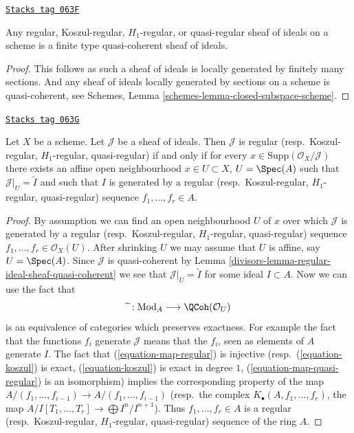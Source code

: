 \begin{lemma}
\label{divisors-lemma-regular-ideal-sheaf-quasi-coherent}
\href{https://stacks.math.columbia.edu/tag/063F}{\texttt{Stacks tag 063F}}

Any regular, Koszul-regular, $H_1$-regular, or quasi-regular sheaf
of ideals on a scheme is a finite type quasi-coherent sheaf of ideals.
\end{lemma}

\begin{proof}
This follows as such a sheaf of ideals is locally generated by
finitely many sections. And any sheaf of ideals locally generated
by sections on a scheme is quasi-coherent, see
Schemes, Lemma \ref{schemes-lemma-closed-subspace-scheme}.
\end{proof}

\begin{lemma}
\label{divisors-lemma-regular-ideal-sheaf-scheme}
\href{https://stacks.math.columbia.edu/tag/063G}{\texttt{Stacks tag 063G}}

Let $X$ be a scheme. Let $\mathcal{J}$ be a sheaf of ideals.
Then $\mathcal{J}$ is regular
(resp.\ Koszul-regular, $H_1$-regular, quasi-regular) if and only if
for every $x \in \text{Supp}(\mathcal{O}_X/\mathcal{J})$ there exists
an affine open neighbourhood $x \in U \subset X$, $U = \Spec(A)$
such that $\mathcal{J}|_U = \widetilde{I}$ and such that $I$
is generated by a regular (resp.\ Koszul-regular, $H_1$-regular,
quasi-regular) sequence $f_1, \ldots, f_r \in A$.
\end{lemma}

\begin{proof}

By assumption we can find an open neighbourhood $U$ of $x$ over which
$\mathcal{J}$ is generated by a
regular (resp.\ Koszul-regular, $H_1$-regular, quasi-regular)
sequence $f_1, \ldots, f_r \in \mathcal{O}_X(U)$. After shrinking
$U$ we may assume that $U$ is affine, say $U = \Spec(A)$.
Since $\mathcal{J}$ is quasi-coherent by
Lemma \ref{divisors-lemma-regular-ideal-sheaf-quasi-coherent}
we see that $\mathcal{J}|_U = \widetilde{I}$ for some ideal $I \subset A$.
Now we can use the fact that
$$
\widetilde{\ } : \text{Mod}_A \longrightarrow \QCoh(\mathcal{O}_U)
$$
is an equivalence of categories which preserves exactness. For example
the fact that the functions $f_i$ generate $\mathcal{J}$ means that
the $f_i$, seen as elements of $A$ generate $I$. The fact that
(\ref{equation-map-regular}) is injective
(resp.\ (\ref{equation-koszul}) is exact, (\ref{equation-koszul}) is exact
in degree $1$, (\ref{equation-map-quasi-regular}) is an isomorphism)
implies the corresponding property of the map
$A/(f_1, \ldots, f_{i - 1}) \to A/(f_1, \ldots, f_{i - 1})$
(resp.\ the complex $K_\bullet(A, f_1, \ldots, f_r)$, the
map $A/I[T_1, \ldots, T_r] \to \bigoplus I^n/I^{n + 1}$).
Thus $f_1, \ldots, f_r \in A$ is a regular
(resp.\ Koszul-regular, $H_1$-regular, quasi-regular)
sequence of the ring $A$.
\end{proof}

